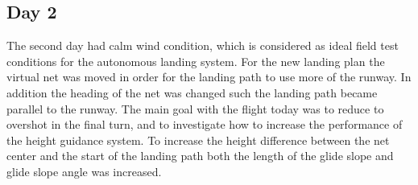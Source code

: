 \subsection{Day 2}
The second day had calm wind condition, which is considered as ideal field test conditions for the autonomous landing system. For the new landing plan the virtual net was moved in order for the landing path to use more of the runway. In addition the heading of the net was changed such the landing path became parallel to the runway. The main goal with the flight today was to reduce to overshot in the final turn, and to investigate how to increase the performance of the height guidance system. To increase the height difference between the net center and the start of the landing path both the length of the glide slope and glide slope angle was increased.


